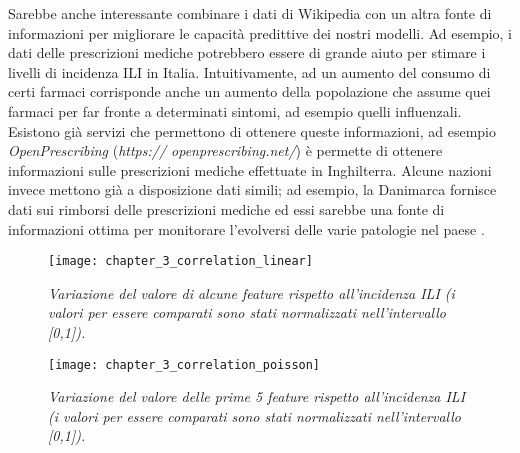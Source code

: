 Sarebbe anche interessante combinare i dati di Wikipedia con un altra fonte di informazioni per migliorare le capacità 
predittive dei nostri modelli. Ad esempio, i dati delle prescrizioni mediche potrebbero essere di grande aiuto per stimare i 
livelli di incidenza ILI in Italia. Intuitivamente, ad un aumento del consumo di certi farmaci corrisponde anche un aumento 
della popolazione che assume quei farmaci per far fronte a determinati sintomi, ad esempio quelli influenzali. Esistono già 
servizi che permettono di ottenere queste informazioni, ad esempio \textit{OpenPrescribing} (\textit{https://
openprescribing.net/}) è permette di ottenere informazioni sulle prescrizioni mediche effettuate in 
Inghilterra. Alcune nazioni invece mettono già a disposizione dati simili; ad esempio, la Danimarca fornisce dati sui 
rimborsi delle prescrizioni mediche ed essi sarebbe una fonte di informazioni ottima per monitorare l'evolversi delle varie 
patologie nel paese \cite{sigrun2012}.
 
  


\begin{figure}[p]
\texttt{[image: chapter\_3\_correlation\_linear]}
\caption{\textit{Variazione del valore di alcune feature rispetto all'incidenza ILI (i valori per essere comparati sono stati normalizzati nell'intervallo [0,1]).}}
\label{fig:ch_3_correlation_linear}
\centering
\end{figure}

\begin{figure}[p]
\texttt{[image: chapter\_3\_correlation\_poisson]}
\caption{\textit{Variazione del valore delle prime 5 feature rispetto all'incidenza ILI (i valori per essere comparati sono stati normalizzati nell'intervallo [0,1]).}}
\label{fig:ch_3_correlation_poisson}
\centering
\end{figure}